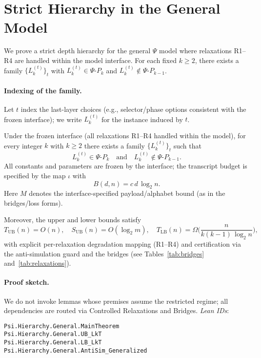 \section{Strict Hierarchy in the General Model}

We prove a strict depth hierarchy for the general \(\Psi\) model where relaxations R1--R4 are handled within the model interface. For each fixed \(k\ge 2\), there exists a family \(\{L_k^{(t)}\}_t\) with \(L_k^{(t)}\in \Psi\text{-}P_k\) and \(L_k^{(t)}\notin \Psi\text{-}P_{k-1}\).

\paragraph{Indexing of the family.}
\begin{definition}
Let \(t\) index the last-layer choices (e.g., selector/phase options consistent with the frozen interface); we write \(L_k^{(t)}\) for the instance induced by \(t\).
\end{definition}

\begin{theorem}\label{thm:psi-general-hierarchy}
Under the frozen interface (all relaxations R1--R4 handled within the model), for every integer \(k\) with \(k\ge 2\) there exists a family \(\{L_k^{(t)}\}_t\) such that
\[
L_k^{(t)} \in \Psi\text{-}P_k \quad\text{and}\quad L_k^{(t)} \notin \Psi\text{-}P_{k-1}.
\]
All constants and parameters are frozen by the interface; the transcript budget is specified by the map \(\iota\) with
\[
B(d,n) = c\, d\, \log_{2} n .
\]
Here \(M\) denotes the interface-specified payload/alphabet bound (as in the bridges/loss forms).

Moreover, the upper and lower bounds satisfy
\[
T_{\mathrm{UB}}(n) = O(n),\quad S_{\mathrm{UB}}(n) = O(\log_{2} m),\quad
T_{\mathrm{LB}}(n) = \Omega\!\Big(\frac{n}{k(k-1)\,\log_{2} n}\Big),
\]
with explicit per-relaxation degradation mapping (R1--R4) and certification via the anti-simulation guard and the bridges (see Tables~\ref{tab:bridges} and~\ref{tab:relaxations}).
\end{theorem}

\paragraph{Proof sketch.}
We do not invoke lemmas whose premises assume the restricted regime; all
dependencies are routed via Controlled Relaxations and Bridges.
\emph{Lean IDs}:
\begin{flushleft}
\small\ttfamily
\texttt{Psi.Hierarchy.General.MainTheorem}\\
\texttt{Psi.Hierarchy.General.UB\_LkT}\\
\texttt{Psi.Hierarchy.General.LB\_LkT}\\
\texttt{Psi.Hierarchy.General.AntiSim\_Generalized}
\end{flushleft}

